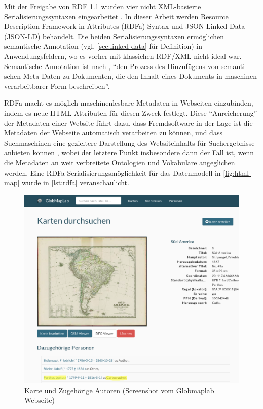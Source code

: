 \documentclass[../main.tex]{subfiles}
\begin{document}
Mit der Freigabe von RDF 1.1 wurden vier nicht XML-basierte Serialisierungssyntaxen eingearbeitet \autocite[vgl.][Abs.~3]{Wood:14:WNR}. In dieser Arbeit werden Resource Description Framework in Attributes (RDFa) Syntax und JSON Linked Data (JSON-LD) behandelt. Die beiden Serialisierungssyntaxen ermöglichen semantische Annotation (vgl. \autoref{sec:linked-data} für Definition) in Anwendungsfeldern, wo es vorher mit klassichen RDF/XML nicht ideal war. Semantische Annotation ist nach \citeauthor[S.~405f]{reif2006semantic}, \hyphenquote{german}{den Prozess des Hinzufügens von semantischen Meta-Daten zu Dokumenten, die den Inhalt eines Dokuments in maschinen-verarbeitbarer Form beschreiben}.

RDFa macht es möglich maschinenlesbare Metadaten in Webseiten einzubinden, indem es neue HTML-Attributen für diesen Zweck festlegt. Diese \hyphenquote{german}{Anreicherung} der Metadaten einer Website führt dazu, dass Fremdsoftware in der Lage ist die Metadaten der Webseite automatisch verarbeiten zu können, und dass Suchmaschinen eine gezieltere Darstellung des Websiteinhalts für Suchergebnisse anbieten können \autocite[vgl.][Abs.~2]{Schreiber:14:RP}, wobei der letztere Punkt insbesondere dann der Fall ist, wenn die Metadaten an weit verbreitete Ontologien und Vokabulare angeglichen werden. Eine RDFa Serialisierungsmöglichkeit für das Datenmodell in \autoref{fig:html-map} wurde in \autoref{lst:rdfa} veranschaulicht.

\begin{figure}[h]
	\centering
	\includegraphics[width=.7\linewidth]{images/htmlmap_marked}
	\caption[Karte und Zugehörige Autoren]{Karte und Zugehörige Autoren (Screenshot vom Globmaplab Webseite)}
	\label{fig:html-map}
\end{figure}
\end{document}
